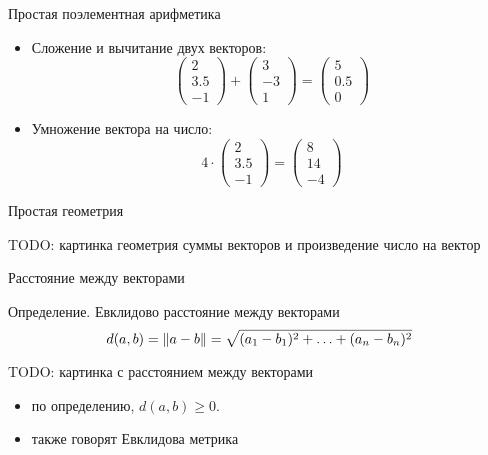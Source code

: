 \documentclass[14pt,xcolor=dvipsnames]{beamer}
\begin{document}
\begin{frame}{Простая поэлементная арифметика}

\begin{itemize}
  \item \alert{Сложение и вычитание} двух векторов:
    \[
    \begin{pmatrix}
      2 \\
      3.5 \\
      -1 
    \end{pmatrix} + \begin{pmatrix}
      3 \\
      -3 \\
      1 
    \end{pmatrix}  = \begin{pmatrix}
      5 \\
      0.5 \\
      0 
    \end{pmatrix}
    \]  
  
  \item \alert{Умножение} вектора на число:
    \[
    4 \cdot \begin{pmatrix}
      2 \\
      3.5 \\
      -1 
    \end{pmatrix} = \begin{pmatrix}
      8 \\
      14 \\
      -4 
    \end{pmatrix}  
    \]
  \end{itemize}
  
  
  \end{frame}

  

\begin{frame}{Простая геометрия}

\begin{block}{TODO: картинка}
геометрия суммы векторов и произведение число на вектор
\end{block}


\end{frame}




\begin{frame}{Расстояние между векторами}

Определение. \alert{Евклидово расстояние} между векторами
  \[
  d(a, b) = \norm{a - b} = \sqrt{(a_1 - b_1)^2 + \ldots + (a_n - b_n)^2}
  \]

\begin{block}{TODO: картинка с расстоянием между векторами}

\end{block}

\begin{itemize}
  \item по определению, $d(a, b) \geq 0$. 
  \item также говорят \alert{Евклидова метрика}
\end{itemize}


\end{frame}
\end{document}
